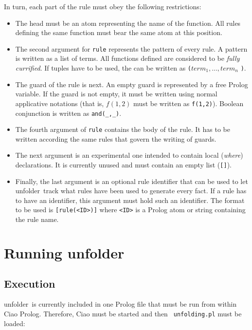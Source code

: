 \documentclass[11pt,a4paper,twoside,openright]{book}
\newcommand{\unfolder}{{\textsf{unfolder~}}}
\begin{document}
\noindent
In turn, each part of the rule must obey the following restrictions:

\begin{itemize}
\item
The head must be an atom representing the name of the function. All
rules defining the same function must bear the same atom at this
position.

\item
The second argument for {\tt rule} represents the pattern of every
rule. A pattern is written as a list of terms. All functions defined
are considered to be {\em fully currified}. If tuples have to be used,
the can be written as \verb.(.$\mathit{term}_1,\ldots,\mathit{term}_n$
\verb.)..

\item
The guard of the rule is next. An empty guard is represented by a free
Prolog variable. If the guard is not empty, it must be written using
normal applicative notations (that is, $f(1,2)$ must be written as
{\tt f(1,2)}). Boolean conjunction is written as {\tt and(\_,\_)}.

\item
The fourth argument of {\tt rule} contains the body of the rule. It
has to be written according the same rules that govern the writing of
guards.

\item
The next argument is an experimental one intended to contain
local ({\em where}) declarations. It is currently unused and must
contain an empty list (\verb.[].).

\item
Finally, the last argument is an optional rule identifier that can be
used to let \unfolder track what rules have been used to generate
every fact. If a rule has to have an identifier, this argument must
hold such an identifier. The format to be used is {\tt [rule(<ID>)]}
where {\tt <ID>} is a Prolog atom or string containing the rule name. 
\end{itemize}

\chapter{Running \unfolder}
\label{chap_running}

\section{Execution}

\unfolder is currently included in one Prolog file that must be run
from within Ciao Prolog. Therefore, Ciao must be started and then {\tt
  unfolding.pl} must be loaded:
\end{document}
